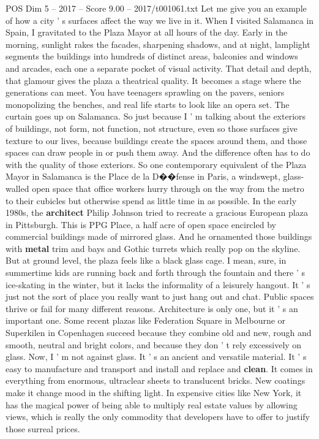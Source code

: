 \begin{textsample}{POS Dim 5 – 2017 – Score 9.00 – 2017/t001061.txt}
Let me give you an example of how a city ' s surfaces affect the way we live in it.
When I visited Salamanca in Spain, I gravitated to the Plaza Mayor at all hours of the day.
Early in the morning, sunlight rakes the facades, sharpening shadows, and at night, lamplight segments the buildings into hundreds of distinct areas, balconies and windows and arcades, each one a separate pocket of visual activity.
That detail and depth, that glamour gives the plaza a theatrical quality.
It becomes a stage where the generations can meet.
You have teenagers sprawling on the pavers, seniors monopolizing the benches, and real life starts to look like an opera set.
The curtain goes up on Salamanca.
So just because I ' m talking about the exteriors of buildings, not form, not function, not structure, even so those surfaces give texture to our lives, because buildings create the spaces around them, and those spaces can draw people in or push them away.
And the difference often has to do with the quality of those exteriors.
So one contemporary equivalent of the Plaza Mayor in Salamanca is the Place de la D{\EmojiFont �}{\EmojiFont �}fense in Paris, a windswept, glass-walled open space that office workers hurry through on the way from the metro to their cubicles but otherwise spend as little time in as possible.
In the early 1980s, the \textbf{architect} Philip Johnson tried to recreate a gracious European plaza in Pittsburgh.
This is PPG Place, a half acre of open space encircled by commercial buildings made of mirrored glass.
And he ornamented those buildings with \textbf{metal} trim and bays and Gothic turrets which really pop on the skyline.
But at ground level, the plaza feels like a black glass cage.
I mean, sure, in summertime kids are running back and forth through the fountain and there ' s ice-skating in the winter, but it lacks the informality of a leisurely hangout.
It ' s just not the sort of place you really want to just hang out and chat.
Public spaces thrive or fail for many different reasons.
Architecture is only one, but it ' s an important one.
Some recent plazas like Federation Square in Melbourne or Superkilen in Copenhagen succeed because they combine old and new, rough and smooth, neutral and bright colors, and because they don ' t rely excessively on glass.
Now, I ' m not against glass.
It ' s an ancient and versatile material.
It ' s easy to manufacture and transport and install and replace and \textbf{clean}.
It comes in everything from enormous, ultraclear sheets to translucent bricks.
New coatings make it change mood in the shifting light.
In expensive cities like New York, it has the magical power of being able to multiply real estate values by allowing views, which is really the only commodity that developers have to offer to justify those surreal prices.

\end{textsample}
